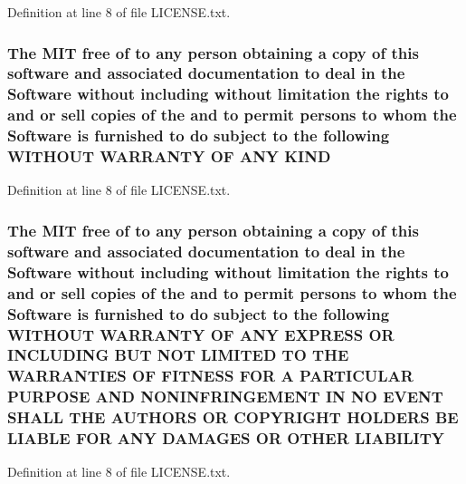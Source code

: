 Definition at line 8 of file L\-I\-C\-E\-N\-S\-E.\-txt.

\hypertarget{LICENSE_8txt_a8e1a82be600178fe97c0e1339897c260}{
\subsubsection[{K\-I\-N\-D}]{\setlength{\rightskip}{0pt plus 5cm}The M\-I\-T free of to any person obtaining a {\bf copy} of this software and associated documentation to deal in the {\bf Software} without including without limitation the rights to and or sell copies of the and to permit persons to whom the {\bf Software} is furnished to do subject to the following W\-I\-T\-H\-O\-U\-T W\-A\-R\-R\-A\-N\-T\-Y O\-F A\-N\-Y K\-I\-N\-D}}\label{LICENSE_8txt_a8e1a82be600178fe97c0e1339897c260}


Definition at line 8 of file L\-I\-C\-E\-N\-S\-E.\-txt.

\hypertarget{LICENSE_8txt_a154c0f6f925190567752588d1ff5458f}{
\subsubsection[{L\-I\-A\-B\-I\-L\-I\-T\-Y}]{\setlength{\rightskip}{0pt plus 5cm}The M\-I\-T free of to any person obtaining a {\bf copy} of this software and associated documentation to deal in the {\bf Software} without including without limitation the rights to and or sell copies of the and to permit persons to whom the {\bf Software} is furnished to do subject to the following W\-I\-T\-H\-O\-U\-T W\-A\-R\-R\-A\-N\-T\-Y O\-F A\-N\-Y E\-X\-P\-R\-E\-S\-S O\-R I\-N\-C\-L\-U\-D\-I\-N\-G B\-U\-T N\-O\-T L\-I\-M\-I\-T\-E\-D T\-O T\-H\-E W\-A\-R\-R\-A\-N\-T\-I\-E\-S O\-F F\-I\-T\-N\-E\-S\-S F\-O\-R A P\-A\-R\-T\-I\-C\-U\-L\-A\-R P\-U\-R\-P\-O\-S\-E A\-N\-D N\-O\-N\-I\-N\-F\-R\-I\-N\-G\-E\-M\-E\-N\-T I\-N N\-O E\-V\-E\-N\-T S\-H\-A\-L\-L T\-H\-E A\-U\-T\-H\-O\-R\-S O\-R C\-O\-P\-Y\-R\-I\-G\-H\-T H\-O\-L\-D\-E\-R\-S B\-E L\-I\-A\-B\-L\-E F\-O\-R A\-N\-Y D\-A\-M\-A\-G\-E\-S O\-R O\-T\-H\-E\-R L\-I\-A\-B\-I\-L\-I\-T\-Y}}\label{LICENSE_8txt_a154c0f6f925190567752588d1ff5458f}


Definition at line 8 of file L\-I\-C\-E\-N\-S\-E.\-txt.

